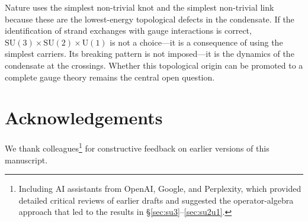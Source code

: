 \documentclass[11pt,a4paper]{article}
\begin{document}
Nature uses the simplest non-trivial
knot and the simplest non-trivial link because these are the
lowest-energy topological defects in the condensate.
If the identification of strand exchanges with gauge interactions
is correct, $\mathrm{SU}(3) \times \mathrm{SU}(2) \times
\mathrm{U}(1)$ is not a choice---it is a consequence of using
the simplest carriers.  Its breaking pattern is not imposed---it
is the dynamics of the condensate at the crossings.  Whether
this topological origin can be promoted to a complete gauge
theory remains the central open question.


\section*{Acknowledgements}

We thank colleagues\footnote{Including AI assistants from OpenAI,
Google, and Perplexity, which provided detailed critical reviews
of earlier drafts and suggested the operator-algebra approach
that led to the results in \S\ref{sec:su3}--\ref{sec:su2u1}.}
for constructive feedback on earlier versions of this manuscript.
\end{document}
